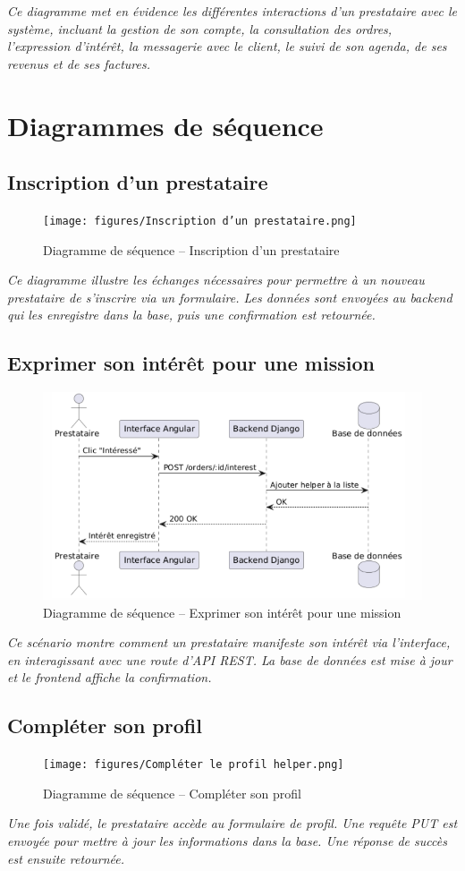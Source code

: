 \textit{Ce diagramme met en évidence les différentes interactions d’un prestataire avec le système, incluant la gestion de son compte, la consultation des ordres, l’expression d’intérêt, la messagerie avec le client, le suivi de son agenda, de ses revenus et de ses factures.}
\section{Diagrammes de séquence}

\subsection*{Inscription d’un prestataire}
\begin{figure}[H]
\centering
\texttt{[image: figures/Inscription d’un prestataire.png]}
\caption{Diagramme de séquence – Inscription d’un prestataire}
\end{figure}
\textit{Ce diagramme illustre les échanges nécessaires pour permettre à un nouveau prestataire de s’inscrire via un formulaire. Les données sont envoyées au backend qui les enregistre dans la base, puis une confirmation est retournée.}

\subsection*{Exprimer son intérêt pour une mission}
\begin{figure}[H]
\centering
\includegraphics[width=0.85\linewidth]{figures/Exprimer son intérêt pour une mission.png}
\caption{Diagramme de séquence – Exprimer son intérêt pour une mission}
\end{figure}
\textit{Ce scénario montre comment un prestataire manifeste son intérêt via l’interface, en interagissant avec une route d’API REST. La base de données est mise à jour et le frontend affiche la confirmation.}

\subsection*{Compléter son profil}
\begin{figure}[H]
\centering
\texttt{[image: figures/Compléter le profil helper.png]}
\caption{Diagramme de séquence – Compléter son profil}
\end{figure}
\textit{Une fois validé, le prestataire accède au formulaire de profil. Une requête PUT est envoyée pour mettre à jour les informations dans la base. Une réponse de succès est ensuite retournée.}

